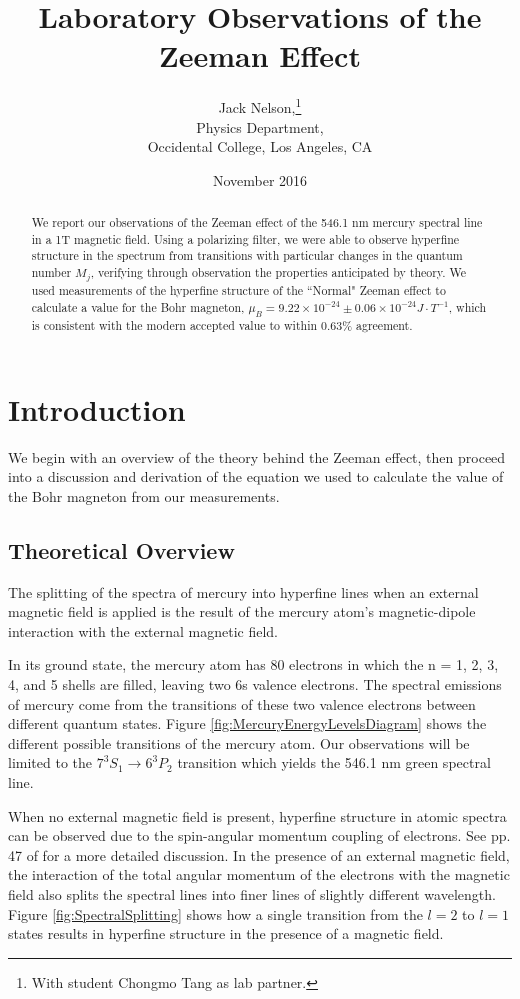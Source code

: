 \documentclass[twocolumn]{article}
\title{Laboratory Observations of the Zeeman Effect}
\author{Jack Nelson,\footnote{With student Chongmo Tang as lab partner.}\\
	Physics Department,\\
	Occidental College, Los Angeles, CA}
\date{November 2016}
\begin{document}
\maketitle

\begin{abstract}
	We report our observations of the Zeeman effect of the 546.1 nm mercury spectral line in a 1T magnetic field.
	Using a polarizing filter, we were able to observe hyperfine structure in the spectrum from transitions with particular changes in the quantum number $M_j$, verifying through observation the properties anticipated by theory.
	We used measurements of the hyperfine structure of the ``Normal" Zeeman effect to calculate a value for the Bohr magneton, $\mu_B = 9.22\times10^{-24}\pm 0.06\times10^{-24} J\cdot T^{-1}$, which is consistent with the modern accepted value to within 0.63\% agreement.
\end{abstract}

\section{Introduction} \label{sec:Intro}
	We begin with an overview of the theory behind the Zeeman effect, then proceed into a discussion and derivation of the equation we used to calculate the value of the Bohr magneton from our measurements.
	
	\subsection{Theoretical Overview} \label{sec:Theory}
		The splitting of the spectra of mercury into hyperfine lines when an external magnetic field is applied is the result of the mercury atom's magnetic-dipole interaction with the external magnetic field.
		 
		In its ground state, the mercury atom has 80 electrons in which the n = 1, 2, 3, 4, and 5 shells are filled, leaving two 6s valence electrons.
		The spectral emissions of mercury come from the transitions of these two valence electrons between different quantum states.
		Figure \ref{fig:MercuryEnergyLevelsDiagram} shows the different possible transitions of the mercury atom.
		Our observations will be limited to the $7^3S_1 \rightarrow 6^3P_2$ transition which yields the 546.1 nm green spectral line.
		
		When no external magnetic field is present, hyperfine structure in atomic spectra can be observed due to the spin-angular momentum coupling of electrons. 
		See pp. 47 of \cite{melissinos_experiments_1966} for a more detailed discussion.
		In the presence of an external magnetic field, the interaction of the total angular momentum of the electrons with the magnetic field also splits the spectral lines into finer lines of slightly different wavelength.
		Figure \ref{fig:SpectralSplitting} shows how a single transition from the $l=2$ to $l=1$ states results in hyperfine structure in the presence of a magnetic field.
		
\end{document}

